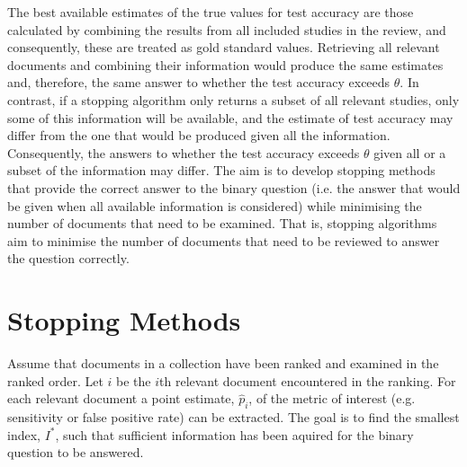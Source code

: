 \documentclass[sigconf,natbib=true,anonymous=true]{acmart}
\begin{document}
The best available estimates of the true values for test accuracy are those calculated by combining the results from all included studies in the review, and consequently, these are treated as gold standard values. Retrieving all relevant documents and combining their information would produce the same estimates and, therefore, the same answer to whether the test accuracy exceeds $\theta$. In contrast, if a stopping algorithm only returns a subset of all relevant studies, only some of this information will be available, and the estimate of test accuracy may differ from the one that would be produced given all the information. Consequently, the answers to whether the test accuracy exceeds $\theta$ given all or a subset of the information may differ. The aim is to develop stopping methods that provide the correct answer to the binary question (i.e. the answer that would be given when all available information is considered) while minimising the number of documents that need to be examined. That is, stopping algorithms aim to minimise the number of documents that need to be reviewed to answer the question correctly. 

\section{Stopping Methods}


Assume that documents in a collection have been ranked and examined in the ranked order. Let $i$ be the $i$th relevant document encountered in the ranking. For each relevant document a point estimate, $\hat{p}_i$, of the metric of interest (e.g. sensitivity or false positive rate) can be extracted. The goal is to find the smallest index, $I^*$, such that sufficient information has been aquired for the binary question to be answered. 
\end{document}
